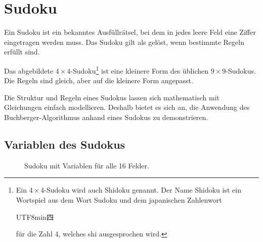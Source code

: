 %
%
%
%


\newcommand\setrow[4]{
  \setcounter{sudokuCol}{1}
  \foreach \n in {#1, #2, #3, #4} {
    \edef\x{\value{sudokuCol} - 0.5}
    \edef\y{4.5 - \value{sudokuRow}}
    \node[anchor=center, font=\Large] at (\x, \y) {\n};
    \stepcounter{sudokuCol}
  }
  \stepcounter{sudokuRow}
}

\section{Sudoku
\label{buchberger:section:sudoku}}

Ein Sudoku ist ein bekanntes Ausfüllrätsel, bei dem in jedes leere Feld eine Ziffer eingetragen werden muss.
%
Das Sudoku gilt als gelöst, wenn bestimmte Regeln erfüllt sind.

Das abgebildete $4 \times 4$-Sudoku\footnote{
  Ein $4 \times 4$-Sudoku wird auch Shidoku genannt.
  Der Name Shidoku ist ein Wortspiel aus dem Wort Sudoku und dem japanischen Zahlenwort \begin{CJK}{UTF8}{min}四\end{CJK} für die Zahl 4, welches shi ausgesprochen wird. %
%
%
%
}
ist eine kleinere Form des üblichen $9 \times 9$-Sudokus.
Die Regeln sind gleich, aber auf die kleinere Form angepasst.

Die Struktur und Regeln eines Sudokus lassen sich mathematisch mit Gleichungen einfach modellieren.
Deshalb bietet es sich an, die Anwendung des Buchberger-Algorithmus anhand eines Sudokus zu demonstrieren.

\subsection{Variablen des Sudokus
\label{buchberger:subsection:variablen-des-sudokus}}

\begin{figure}
  \centering
  
  
  \caption{Sudoku mit Variablen für alle 16 Felder.
  \label{buchberger:sudoku-combined}
  }
\end{figure}

